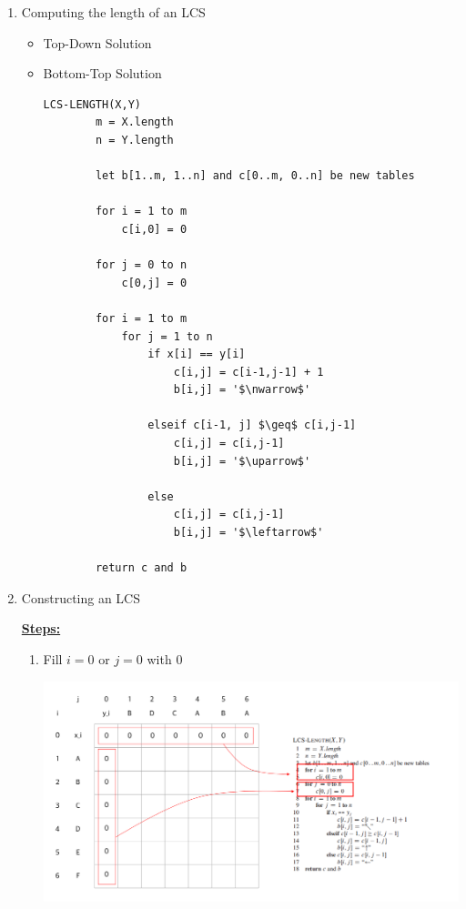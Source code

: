 \documentclass[12pt]{article}
\begin{document}
\begin{enumerate}[1.]
\begin{itemize}
\begin{itemize}
\begin{enumerate}[1.]
                \item Computing the length of an LCS

                \bigskip

                \begin{itemize}
                    \item Top-Down Solution
                    \item Bottom-Top Solution

    \begin{lstlisting}[mathescape=true]
    LCS-LENGTH(X,Y)
        m = X.length
        n = Y.length

        let b[1..m, 1..n] and c[0..m, 0..n] be new tables

        for i = 1 to m
            c[i,0] = 0

        for j = 0 to n
            c[0,j] = 0

        for i = 1 to m
            for j = 1 to n
                if x[i] == y[i]
                    c[i,j] = c[i-1,j-1] + 1
                    b[i,j] = '$\nwarrow$'

                elseif c[i-1, j] $\geq$ c[i,j-1]
                    c[i,j] = c[i,j-1]
                    b[i,j] = '$\uparrow$'

                else
                    c[i,j] = c[i,j-1]
                    b[i,j] = '$\leftarrow$'

        return c and b
    \end{lstlisting}
                \end{itemize}
                \item Constructing an LCS

                \bigskip

                \underline{\textbf{Steps:}}

                \bigskip

                \begin{enumerate}[1)]
                    \item Fill $i = 0$ or $j = 0$ with 0

                    \begin{center}
                    \includegraphics[width=\linewidth]{images/worksheet_3_solution_12.png}
                    \end{center}


\end{enumerate}
\end{enumerate}
\end{itemize}
\end{itemize}
\end{enumerate}
\end{document}
